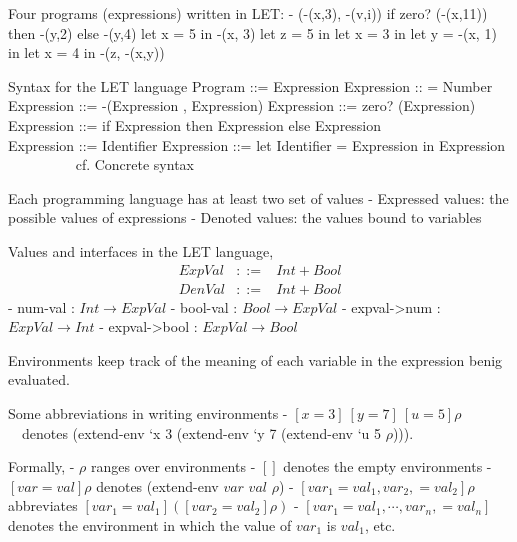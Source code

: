 \documentclass{article}
\begin{document}
\begin{huge}

Four programs (expressions) written in LET: \al
\al
- (-(x,3), -(v,i)) \al
\al
if zero? (-(x,11)) then -(y,2) else -(y,4) \al
\al
let x = 5 in -(x, 3) \al
\al
let z = 5 in let x = 3 in let y = -(x, 1) in let x = 4 in -(z, -(x,y))


Syntax for the LET language \al
\al
Program ::= Expression  \al
\al
Expression :: = Number  \al
Expression ::= -(Expression , Expression)  \al
Expression ::= zero? (Expression)  \al
Expression ::= if Expression then Expression else Expression \al 
\ \ \ \ \ \ \ \ \  \al
Expression ::= Identifier  \al
Expression ::= let Identifier = Expression in Expression \al
\ \ \ \ \ \ \ \ \ 
\al
\al
cf. Concrete syntax 


Each programming language has at least two set of values \al
- Expressed values: the possible values of expressions \al
- Denoted values: the values bound to variables

Values and interfaces in the LET language,
\begin{eqnarray*}
ExpVal & ::= & Int + Bool \\
DenVal & ::= & Int + Bool
\end{eqnarray*}
\al
- num-val : $Int \rightarrow ExpVal$ \al
- bool-val : $Bool \rightarrow ExpVal$ \al
- expval-\textgreater num : $ExpVal \rightarrow Int$ \al
- expval-\textgreater bool : $ExpVal \rightarrow Bool$ 


Environments keep track of the meaning of each variable in the expression benig evaluated.

Some abbreviations in writing environments\al
- $[x=3] \ [y=7] \ [u=5]\rho$ \al
\ \ denotes (extend-env `x 3 (extend-env `y 7 (extend-env `u 5 $\rho$))).

Formally, \al
- $\rho$ ranges over environments \al
- $[]$ denotes the empty environments \al
- $[var=val]\rho$ denotes (extend-env $var$ $val$ $\rho$) \al
- $[var_1=val_1,var_2,=val_2]\rho$ abbreviates $[var_1=val_1]([var_2=val_2]\rho)$ \al
- $[var_1=val_1,\cdots, var_n,=val_n]$ denotes the environment in which the value of $var_1$ is $val_1$, etc.


\end{huge}
\end{document}
